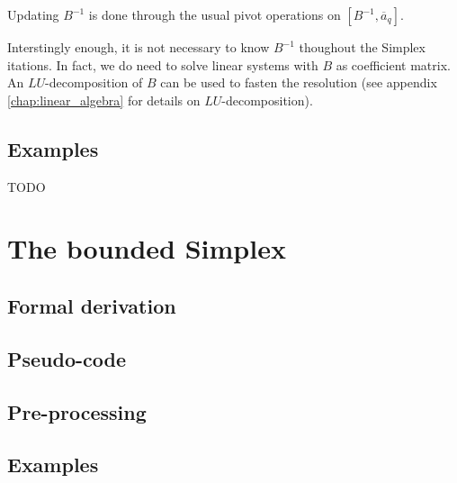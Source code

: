 Updating $B^{-1}$ is done through the usual pivot operations on $[B^{-1}, \overline a_q]$. 

Interstingly enough, it is not necessary to know $B^{-1}$ thoughout the Simplex itations. In fact, we do need to solve linear systems with $B$ as coefficient matrix. An $LU$-decomposition of $B$ can be used to fasten the resolution (see appendix \ref{chap:linear_algebra} for details on $LU$-decomposition).

\subsection{Examples}

TODO

\section{The bounded Simplex}
\subsection{Formal derivation}
\subsection{Pseudo-code}
\subsection{Pre-processing}
\subsection{Examples}
